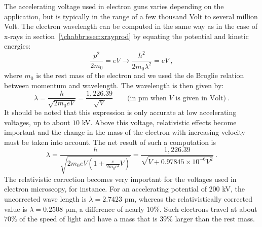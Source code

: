 The accelerating voltage used in electron guns varies depending on the application, but is typically in the range of a few thousand Volt to several million Volt.  The electron wavelength can be computed in the same way as in the case of x-rays in section~\ref{\chabbr:ssec:xrayprod} by equating the potential and kinetic energies:
\[
	\frac{p^2}{2m_0} = eV \rightarrow \frac{h^2}{2m_0\lambda^2}=eV\ ,
\]
where $m_0$ is the rest mass of the electron and we used the de Broglie relation between momentum and wavelength. The wavelength is then given by:
\begin{equation}
	\lambda = \frac{h}{\sqrt{2m_0eV}} = \frac{1,226.39}{\sqrt{V}}\qquad\text{(in pm when $V$ is given in Volt)}\ .\label{\chabbr:eq:ewavelength1}
\end{equation}
It should be noted that this expression is only accurate at low accelerating voltages, up to about $10$ kV. Above this voltage, relativistic effects become important and the change in the mass of the electron with increasing velocity must be taken into account.  The net result of such a computation is 
\begin{equation}
	\lambda = \frac{h}{\sqrt{2m_0eV\left(1+\frac{e}{2m_0c^2}V\right)}} = \frac{1,226.39}{\sqrt{V+0.97845\times 10^{-6}V^2}}\ .\label{\chabbr:eq:ewavelength2}
\end{equation}
The relativistic correction becomes very important for the voltages used in electron microscopy, for instance. For an accelerating potential of $200$ kV, the uncorrected wave length is $\lambda=2.7423$ pm, whereas the relativistically corrected value is $\lambda=0.2508$ pm, a difference of nearly $10\%$. Such electrons travel at about $70\%$ of the speed of light and have a mass that is $39\%$ larger than the rest mass. 

